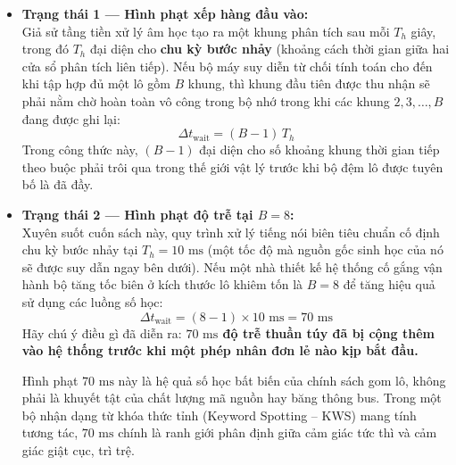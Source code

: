 \documentclass[11pt,a4paper]{article}
\begin{document}
\begin{itemize}\setlength{\itemsep}{2pt}\setlength{\parskip}{0pt}
    \item \textbf{Trạng thái 1 --- Hình phạt xếp hàng đầu vào:}\\
    Giả sử tầng tiền xử lý âm học tạo ra một khung phân tích sau mỗi $T_h$ giây, trong đó $T_h$ đại diện cho \textbf{chu kỳ bước nhảy} (khoảng cách thời gian giữa hai cửa sổ phân tích liên tiếp). Nếu bộ máy suy diễn từ chối tính toán cho đến khi tập hợp đủ một lô gồm $B$ khung, thì khung đầu tiên được thu nhận sẽ phải nằm chờ hoàn toàn vô công trong bộ nhớ trong khi các khung $2, 3, \dots, B$ đang được ghi lại:
    \[
    \Delta t_{\text{wait}} = (B - 1) \, T_h
    \]
    Trong công thức này, $(B-1)$ đại diện cho số khoảng khung thời gian tiếp theo buộc phải trôi qua trong thế giới vật lý trước khi bộ đệm lô được tuyên bố là đã đầy.

    \item \textbf{Trạng thái 2 --- Hình phạt độ trễ tại $B = 8$:}\\
    Xuyên suốt cuốn sách này, quy trình xử lý tiếng nói biên tiêu chuẩn cố định chu kỳ bước nhảy tại $T_h = 10\text{ ms}$ (một tốc độ mà nguồn gốc sinh học của nó sẽ được suy dẫn ngay bên dưới). Nếu một nhà thiết kế hệ thống cố gắng vận hành bộ tăng tốc biên ở kích thước lô khiêm tốn là $B = 8$ để tăng hiệu quả sử dụng các luồng số học:
    \[
    \Delta t_{\text{wait}} = (8 - 1) \times 10\text{ ms} = 70\text{ ms}
    \]
    Hãy chú ý điều gì đã diễn ra: \textbf{$70\text{ ms}$ độ trễ thuần túy đã bị cộng thêm vào hệ thống trước khi một phép nhân đơn lẻ nào kịp bắt đầu.}
    
    Hình phạt $70\text{ ms}$ này là hệ quả số học bất biến của chính sách gom lô, không phải là khuyết tật của chất lượng mã nguồn hay băng thông bus. Trong một bộ nhận dạng từ khóa thức tỉnh (Keyword Spotting -- KWS) mang tính tương tác, $70\text{ ms}$ chính là ranh giới phân định giữa cảm giác tức thì và cảm giác giật cục, trì trệ.
\end{itemize}
\end{document}
